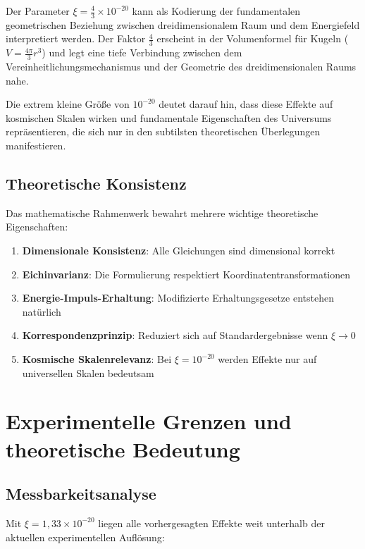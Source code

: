\documentclass[12pt,a4paper]{article}
\theoremstyle{definition}
\begin{document}
	Der Parameter $\xi = \frac{4}{3} \times 10^{-20}$ kann als Kodierung der fundamentalen geometrischen Beziehung zwischen dreidimensionalem Raum und dem Energiefeld interpretiert werden. Der Faktor $\frac{4}{3}$ erscheint in der Volumenformel f\"ur Kugeln ($V = \frac{4\pi}{3}r^3$) und legt eine tiefe Verbindung zwischen dem Vereinheitlichungsmechanismus und der Geometrie des dreidimensionalen Raums nahe.
	
	Die extrem kleine Gr\"o\ss e von $10^{-20}$ deutet darauf hin, dass diese Effekte auf kosmischen Skalen wirken und fundamentale Eigenschaften des Universums repr\"asentieren, die sich nur in den subtilsten theoretischen \"Uberlegungen manifestieren.
	
	\subsection{Theoretische Konsistenz}
	
	Das mathematische Rahmenwerk bewahrt mehrere wichtige theoretische Eigenschaften:
	
	\begin{enumerate}
		\item \textbf{Dimensionale Konsistenz}: Alle Gleichungen sind dimensional korrekt
		\item \textbf{Eichinvarianz}: Die Formulierung respektiert Koordinatentransformationen
		\item \textbf{Energie-Impuls-Erhaltung}: Modifizierte Erhaltungsgesetze entstehen nat\"urlich
		\item \textbf{Korrespondenzprinzip}: Reduziert sich auf Standardergebnisse wenn $\xi \rightarrow 0$
		\item \textbf{Kosmische Skalenrelevanz}: Bei $\xi = 10^{-20}$ werden Effekte nur auf universellen Skalen bedeutsam
	\end{enumerate}
	
	\section{Experimentelle Grenzen und theoretische Bedeutung}
	
	\subsection{Messbarkeitsanalyse}
	
	Mit $\xi = 1{,}33 \times 10^{-20}$ liegen alle vorhergesagten Effekte weit unterhalb der aktuellen experimentellen Aufl\"osung:
	
\end{document}
